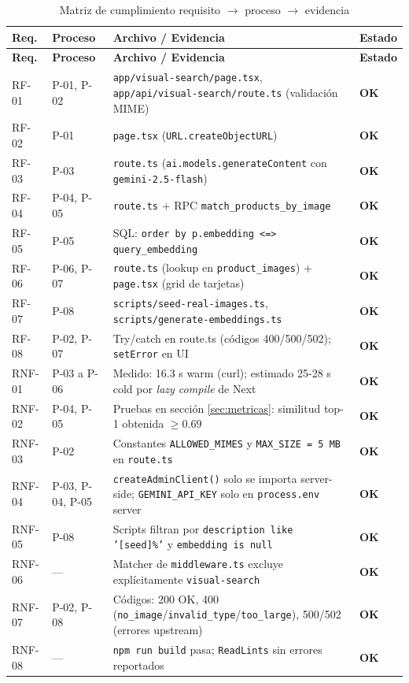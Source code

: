 \documentclass[11pt,letterpaper]{article}
\newcommand{\estado}[1]{\textcolor{viogiaccent}{\textbf{#1}}}
\begin{document}
\begin{longtable}{@{}l l p{7cm} l@{}}
\caption{Matriz de cumplimiento requisito $\rightarrow$ proceso $\rightarrow$ evidencia}\label{tab:matriz}\\
\toprule
\textbf{Req.} & \textbf{Proceso} & \textbf{Archivo / Evidencia} & \textbf{Estado} \\
\midrule
\endfirsthead
\toprule
\textbf{Req.} & \textbf{Proceso} & \textbf{Archivo / Evidencia} & \textbf{Estado} \\
\midrule
\endhead
RF-01  & P-01, P-02 & \texttt{app/visual-search/page.tsx}, \texttt{app/api/visual-search/route.ts} (validación MIME) & \estado{OK} \\
RF-02  & P-01       & \texttt{page.tsx} (\texttt{URL.createObjectURL}) & \estado{OK} \\
RF-03  & P-03       & \texttt{route.ts} (\texttt{ai.models.generateContent} con \texttt{gemini-2.5-flash}) & \estado{OK} \\
RF-04  & P-04, P-05 & \texttt{route.ts} + RPC \texttt{match\_products\_by\_image} & \estado{OK} \\
RF-05  & P-05       & SQL: \texttt{order by p.embedding <=> query\_embedding} & \estado{OK} \\
RF-06  & P-06, P-07 & \texttt{route.ts} (lookup en \texttt{product\_images}) + \texttt{page.tsx} (grid de tarjetas) & \estado{OK} \\
RF-07  & P-08       & \texttt{scripts/seed-real-images.ts}, \texttt{scripts/generate-embeddings.ts} & \estado{OK} \\
RF-08  & P-02, P-07 & Try/catch en route.ts (códigos 400/500/502); \texttt{setError} en UI & \estado{OK} \\
\midrule
RNF-01 & P-03 a P-06 & Medido: 16.3 s warm (curl); estimado 25-28 s cold por \textit{lazy compile} de Next & \estado{OK} \\
RNF-02 & P-04, P-05 & Pruebas en sección \ref{sec:metricas}: similitud top-1 obtenida $\geq 0.69$ & \estado{OK} \\
RNF-03 & P-02       & Constantes \texttt{ALLOWED\_MIMES} y \texttt{MAX\_SIZE = 5 MB} en \texttt{route.ts} & \estado{OK} \\
RNF-04 & P-03, P-04, P-05 & \texttt{createAdminClient()} solo se importa server-side; \texttt{GEMINI\_API\_KEY} solo en \texttt{process.env} server & \estado{OK} \\
RNF-05 & P-08       & Scripts filtran por \texttt{description like '[seed]\%'} y \texttt{embedding is null} & \estado{OK} \\
RNF-06 & ---        & Matcher de \texttt{middleware.ts} excluye explícitamente \texttt{visual-search} & \estado{OK} \\
RNF-07 & P-02, P-08 & Códigos: 200 OK, 400 (\texttt{no\_image}/\texttt{invalid\_type}/\texttt{too\_large}), 500/502 (errores upstream) & \estado{OK} \\
RNF-08 & ---        & \texttt{npm run build} pasa; \texttt{ReadLints} sin errores reportados & \estado{OK} \\
\bottomrule
\end{longtable}
\end{document}
